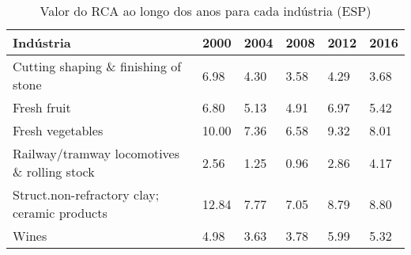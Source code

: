 \begin{table}
\centering
\caption{Valor do RCA ao longo dos anos para cada indústria (ESP)}
\begin{tabular}{p{6cm}p{1.5cm}p{1.5cm}p{1.5cm}p{1.5cm}p{1.5cm}}
\toprule
                                   Indústria &  2000 & 2004 & 2008 & 2012 & 2016 \\
\midrule
        Cutting shaping \& finishing of stone &  6.98 & 4.30 & 3.58 & 4.29 & 3.68 \\
                                 Fresh fruit &  6.80 & 5.13 & 4.91 & 6.97 & 5.42 \\
                            Fresh vegetables & 10.00 & 7.36 & 6.58 & 9.32 & 8.01 \\
 Railway/tramway locomotives \& rolling stock &  2.56 & 1.25 & 0.96 & 2.86 & 4.17 \\
Struct.non-refractory clay; ceramic products & 12.84 & 7.77 & 7.05 & 8.79 & 8.80 \\
                                       Wines &  4.98 & 3.63 & 3.78 & 5.99 & 5.32 \\
\bottomrule
\end{tabular}
\end{table}
